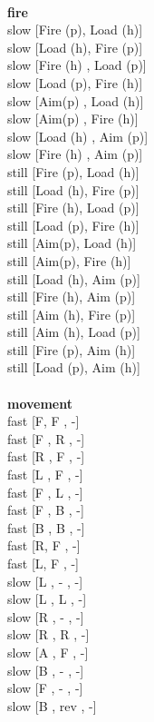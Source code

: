 \ \\ {\bf fire } \\
slow [Fire (p), Load (h)] \\
slow [Load (h), Fire (p)] \\
slow [Fire (h) ,  Load (p)] \\
slow [Load (p), Fire (h)] \\
slow [Aim(p) ,  Load (h)] \\
slow [Aim(p) ,  Fire (h)] \\
slow [Load (h) ,  Aim (p)] \\
slow [Fire (h) ,  Aim (p)] \\
still [Fire (p), Load (h)] \\
still [Load (h), Fire (p)] \\
still [Fire (h), Load (p)] \\
still [Load (p), Fire (h)] \\
still [Aim(p), Load (h)] \\
still [Aim(p), Fire (h)] \\
still [Load (h), Aim (p)] \\
still [Fire (h), Aim (p)] \\
still [Aim (h), Fire (p)] \\
still [Aim (h), Load (p)] \\
still [Fire (p), Aim (h)] \\
still [Load (p), Aim (h)] \\
\ \\ {\bf movement } \\
fast [F,  F ,  -] \\
fast [F ,  R ,  -] \\
fast [R ,  F ,  -] \\
fast [L ,  F ,  -] \\
fast [F ,  L ,  -] \\
fast [F ,  B ,  -] \\
fast [B ,  B ,  -] \\
fast [R,  F ,  -] \\
fast [L,  F ,  -] \\
slow [L ,  - ,  -] \\
slow [L ,  L ,  -] \\
slow [R ,  - ,  -] \\
slow [R ,  R ,  -] \\
slow [A ,  F ,  -] \\
slow [B ,  - ,  -] \\
slow [F ,  - ,  -] \\
slow [B ,  rev ,  -] \\
